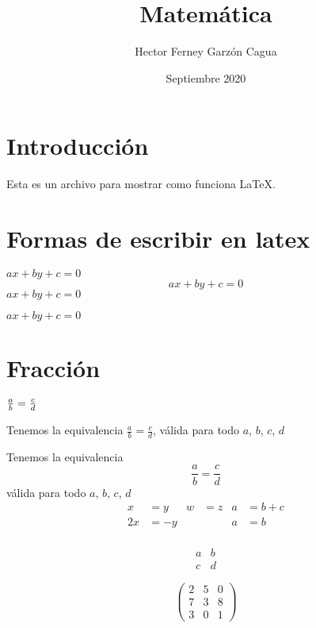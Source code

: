 \documentclass{article}
\title{Matemática}
\author{Hector Ferney Garzón Cagua }
\date{Septiembre 2020}
\begin{document}
\maketitle
\tableofcontents

\section{Introducción}
Esta es un archivo para mostrar como funciona \LaTeX.

\section{Formas de escribir en latex}

\tiny
$ax+by+c=0$
$$ax+by+c=0$$
\( ax+by+c=0 \)

\begin{math}
  ax+by+c=0
\end{math}
\section{Fracción}

\begin{math}
  \frac{a}{b}=\frac{c}{d} \\
\end{math}

Tenemos la equivalencia $\frac{a}{b}=\frac{c}{d}$, válida para todo $a$, $b$, $c$, $d$ \\

\normalsize


Tenemos la equivalencia $$\frac{a}{b}=\frac{c}{d}$$ válida para todo $a$, $b$, $c$, $d$ \\

\begin{align*}
  x &=y    &   w &=z  &   a &= b+c \\
  2x &=-y  &      &   &    a&= b \\
\end{align*}

\begin{equation}
  \begin{matrix}
    a & b \\
    c & d
  \end{matrix}  
\end{equation}

\begin{equation}
  \begin{pmatrix}
    2 & 5 & 0 \\
    7 & 3 & 8 \\ 
    3 & 0 & 1
  \end{pmatrix}
\end{equation}
\end{document}

